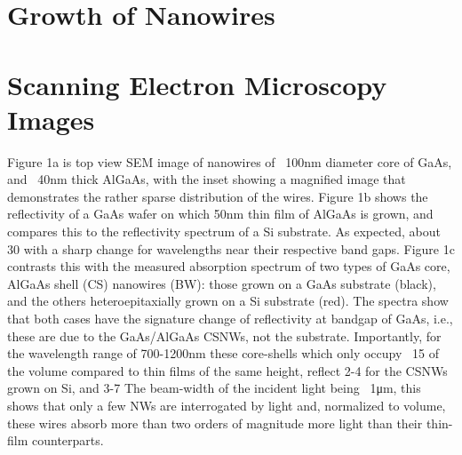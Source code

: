 \section{Growth of Nanowires}



\section{Scanning Electron Microscopy Images} 

Figure 1a is top view SEM image of nanowires of ~100nm diameter core of GaAs,
and ~40nm thick AlGaAs, with the inset showing a magnified image that
demonstrates the rather sparse distribution of the wires. Figure 1b shows the
reflectivity of a GaAs wafer on which 50nm thin film of AlGaAs is grown, and
compares this to the reflectivity spectrum of a Si substrate. As expected,
about 30%
with a sharp change for wavelengths near their respective band gaps. Figure 1c
contrasts this with the measured absorption spectrum of two types of GaAs core,
AlGaAs shell (CS) nanowires (BW): those grown on a GaAs substrate (black), and
the others heteroepitaxially grown on a Si substrate (red). The spectra show
that both cases have the signature change of reflectivity at bandgap of GaAs,
i.e., these are due to the GaAs/AlGaAs CSNWs, not the substrate. Importantly,
for the wavelength range of 700-1200nm these core-shells which only occupy ~15%
of the volume compared to thin films of the same height, reflect 2-4%
for the CSNWs grown on Si, and 3-7%
The beam-width of the incident light being ~1μm, this shows that only a few NWs
are interrogated by light and, normalized to volume, these wires absorb more
than two orders of magnitude more light than their thin-film counterparts.


